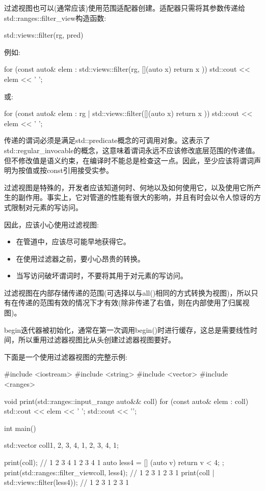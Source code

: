 
过滤视图也可以(通常应该)使用范围适配器创建。适配器只需将其参数传递给std::ranges::filter\_view构造函数:

\begin{cpp}
std::views::filter(rg, pred)
\end{cpp}

例如:

\begin{cpp}
for (const auto& elem : std::views::filter(rg, [](auto x) {
						return x %
					})) {
	std::cout << elem << ' ';
}
\end{cpp}

或:

\begin{cpp}
for (const auto& elem : rg | std::views::filter([](auto x) {
						return x %
					})) {
	std::cout << elem << ' ';
}
\end{cpp}

传递的谓词必须是满足std::predicate概念的可调用对象。这表示了std::regular\_invocable的概念，这意味着谓词永远不应该修改底层范围的传递值。但不修改值是语义约束，在编译时不能总是检查这一点。因此，至少应该将谓词声明为按值或按const引用接受实参。

过滤视图是特殊的，开发者应该知道何时、何地以及如何使用它，以及使用它所产生的副作用。事实上，它对管道的性能有很大的影响，并且有时会以令人惊讶的方式限制对元素的写访问。

因此，应该小心使用过滤视图:

\begin{itemize}
\item
在管道中，应该尽可能早地获得它。

\item
在使用过滤器之前，要小心昂贵的转换。

\item
当写访问破坏谓词时，不要将其用于对元素的写访问。
\end{itemize}

过滤视图在内部存储传递的范围(可选择以与all()相同的方式转换为视图)，所以只有在传递的范围有效的情况下才有效(除非传递了右值，则在内部使用了归属视图)。

begin迭代器被初始化，通常在第一次调用begin()时进行缓存，这总是需要线性时间，所以重用过滤器视图比从头创建过滤器视图要好。

下面是一个使用过滤器视图的完整示例:


\begin{cpp}
#include <iostream>
#include <string>
#include <vector>
#include <ranges>

void print(std::ranges::input_range auto&& coll)
{
	for (const auto& elem : coll) {
		std::cout << elem << ' ';
	}
	std::cout << '\n';
}

int main()
{
	std::vector coll{1, 2, 3, 4, 1, 2, 3, 4, 1};
	
	print(coll); // 1 2 3 4 1 2 3 4 1
	auto less4 = [] (auto v) { return v < 4; };
	print(std::ranges::filter_view{coll, less4}); // 1 2 3 1 2 3 1
	print(coll | std::views::filter(less4)); // 1 2 3 1 2 3 1
}
\end{cpp}

